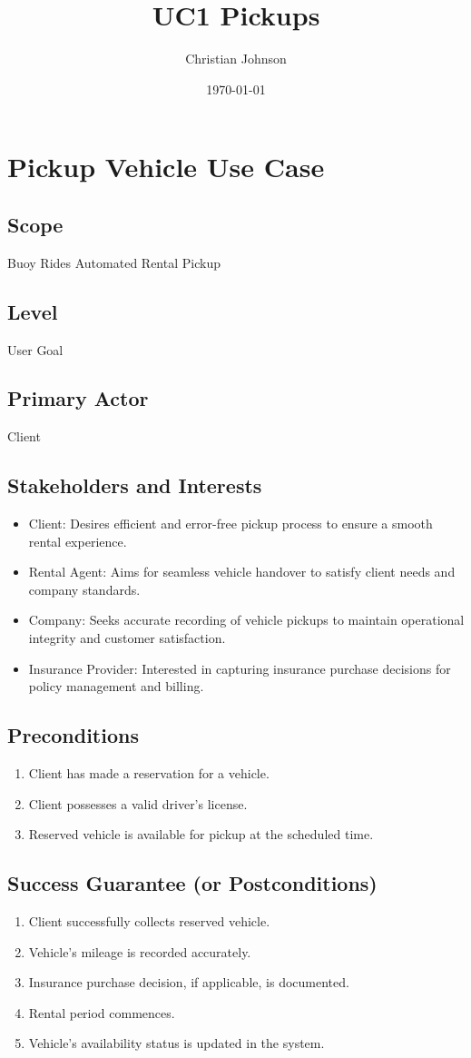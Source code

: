 \documentclass[11pt]{article}
\author{Christian Johnson}
\date{\today}
\title{UC1 Pickups}
\begin{document}
\section*{Pickup Vehicle Use Case}
\label{sec:orgf5264b9}

\subsection*{Scope}
\label{sec:orgd7aced9}
Buoy Rides Automated Rental Pickup
\subsection*{Level}
\label{sec:org91f5af2}
User Goal
\subsection*{Primary Actor}
\label{sec:org57e64c6}
Client
\subsection*{Stakeholders and Interests}
\label{sec:org1973d57}
\begin{itemize}
\item Client: Desires efficient and error-free pickup process to ensure a smooth rental experience.
\item Rental Agent: Aims for seamless vehicle handover to satisfy client needs and company standards.
\item Company: Seeks accurate recording of vehicle pickups to maintain operational integrity and customer satisfaction.
\item Insurance Provider: Interested in capturing insurance purchase decisions for policy management and billing.
\end{itemize}
\subsection*{Preconditions}
\label{sec:org795ed7b}
\begin{enumerate}
\item Client has made a reservation for a vehicle.
\item Client possesses a valid driver's license.
\item Reserved vehicle is available for pickup at the scheduled time.
\end{enumerate}
\subsection*{Success Guarantee (or Postconditions)}
\label{sec:org82df472}
\begin{enumerate}
\item Client successfully collects reserved vehicle.
\item Vehicle's mileage is recorded accurately.
\item Insurance purchase decision, if applicable, is documented.
\item Rental period commences.
\item Vehicle's availability status is updated in the system.
\end{enumerate}
\end{document}
